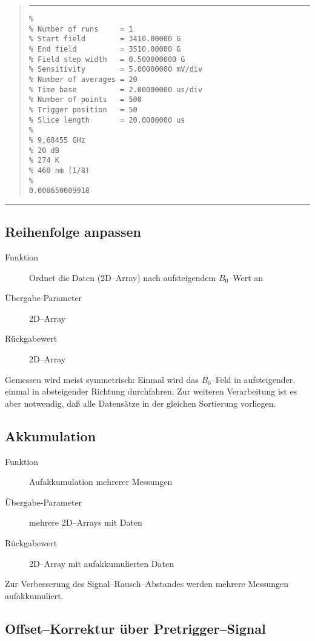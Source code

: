 \documentclass{article}
\newenvironment{Quote}{\begin{quote}\small\vspace*{1em}\hrule\vspace*{1ex}
}{\end{quote}\hrule\vspace*{1em}}
\begin{document}
\begin{Quote}
\begin{verbatim}
% 
% Number of runs     = 1
% Start field        = 3410.00000 G
% End field          = 3510.00000 G
% Field step width   = 0.500000000 G
% Sensitivity        = 5.00000000 mV/div
% Number of averages = 20
% Time base          = 2.00000000 us/div
% Number of points   = 500
% Trigger position   = 50
% Slice length       = 20.0000000 us
% 
% 9,68455 GHz
% 20 dB
% 274 K
% 460 nm (1/8)
% 
0.000650009918
\end{verbatim}
\end{Quote}



\subsection{Reihenfolge anpassen}

\begin{description}
  \item[Funktion] Ordnet die Daten (2D--Array) nach aufsteigendem $B_0$--Wert an
  \item[Übergabe-Parameter] 2D--Array
  \item[Rückgabewert] 2D--Array
\end{description}

Gemessen wird meist symmetrisch: Einmal wird das $B_0$--Feld in aufsteigender,
einmal in absteigender Richtung durchfahren. Zur weiteren Verarbeitung ist es
aber notwendig, daß alle Datensätze in der gleichen Sortierung vorliegen.


\subsection{Akkumulation}

\begin{description}
  \item[Funktion] Aufakkumulation mehrerer Messungen
  \item[Übergabe-Parameter] mehrere 2D--Arrays mit Daten
  \item[Rückgabewert] 2D--Array mit aufakkumulierten Daten
\end{description}

Zur Verbesserung des Signal--Rausch--Abstandes werden mehrere Messungen aufakkumuliert.


\subsection{Offset--Korrektur über Pretrigger--Signal}
\end{document}
